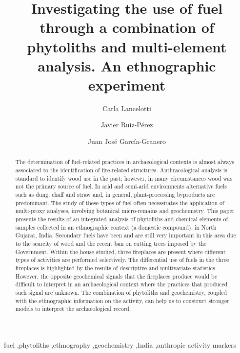 \documentclass[authoryear,preprint,review,12pt]{elsarticle}
\begin{document}
\begin{frontmatter}

\title{Investigating the use of fuel through a combination of phytoliths and multi-element analysis. An ethnographic experiment}

\author[label1,label2]{Carla Lancelotti}
\author[label1,label3]{Javier Ruiz-Pérez}
\author[label1,label4]{Juan José García-Granero}
\address[label1]{CaSEs - Complexity and Socio-Ecological Dynamics Research Group}
\address[label2]{Department of Humanities, Pompeu Fabra University, Barcelona (Spain)}
\address[label3]{Department of Animal and Plant Biology and Ecology, Faculty of Biosciences, Autonomous University of Barcelona, Barcelona (Spain)}
\address[label4]{Department of Archaeology and Anthropology, Instituciò Milà i Fontanals, Spanish Research Council (CSIC)}


\begin{abstract}
The determination of fuel-related practices in archaeological contexts is almost always associated to the identification of fire-related structures. Anthracological analysis is standard to identify wood use in the past; however, in many circumstances wood was not the primary source of fuel. In arid and semi-arid environments alternative fuels such as dung, chaff and straw and, in general, plant-processing byproducts are predominant. The study of these types of fuel often necessitates the application of multi-proxy analyses, involving botanical micro-remains and geochemistry.
This paper presents the results of an integrated analysis of phytoliths and chemical elements of samples collected in an ethnographic context (a domestic compound), in North Gujarat, India. Secondary fuels have been and are still very important in this area due to the scarcity of wood and the recent ban on cutting trees imposed by the Government. Within the house studied, three fireplaces are present where different types of activities are performed selectively. The differential use of fuels in the three fireplaces is highlighted by the results of descriptive and multivariate statistics. However, the opposite geochemical signals that the fireplaces produce would be difficult to interpret in an archaeological context where the practices that produced such signal are unknown. The combination of phytoliths and geochemistry, coupled with the ethnographic information on the activity, can help us to construct stronger models to interpret the archaeological record.
\end{abstract}

\begin{keyword}
fuel \sep phytoliths \sep ethnography \sep geochemistry \sep India \sep anthropic activity markers
\end{keyword}

\end{frontmatter}
\end{document}
